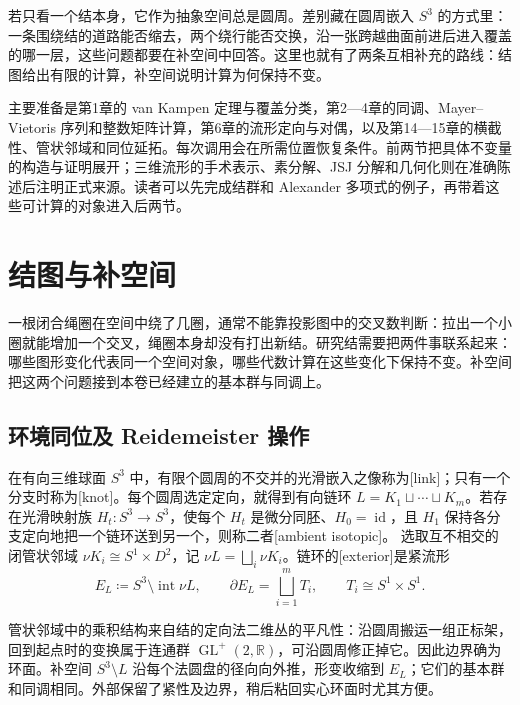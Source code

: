 若只看一个结本身，它作为抽象空间总是圆周。差别藏在圆周嵌入 \(S^3\) 的方式里：一条围绕结的道路能否缩去，两个绕行能否交换，沿一张跨越曲面前进后进入覆盖的哪一层，这些问题都要在补空间中回答。这里也就有了两条互相补充的路线：结图给出有限的计算，补空间说明计算为何保持不变。

\ProseParagraphBreak

主要准备是第1章的 van Kampen 定理与覆盖分类，第2—4章的同调、Mayer--Vietoris 序列和整数矩阵计算，第6章的流形定向与对偶，以及第14—15章的横截性、管状邻域和同位延拓。每次调用会在所需位置恢复条件。前两节把具体不变量的构造与证明展开；三维流形的手术表示、素分解、JSJ 分解和几何化则在准确陈述后注明正式来源。读者可以先完成结群和 Alexander 多项式的例子，再带着这些可计算的对象进入后两节。

\section{结图与补空间}
\label{g2:sec:A01}

一根闭合绳圈在空间中绕了几圈，通常不能靠投影图中的交叉数判断：拉出一个小圈就能增加一个交叉，绳圈本身却没有打出新结。研究结需要把两件事联系起来：哪些图形变化代表同一个空间对象，哪些代数计算在这些变化下保持不变。补空间把这两个问题接到本卷已经建立的基本群与同调上。

\subsection{环境同位及 Reidemeister 操作}
\label{g2:subsec:A01:01}

\begin{definition}\label{g2:def:oriented-link-exterior}
	在有向三维球面 \(S^3\) 中，有限个圆周的不交并的光滑嵌入之像称为[link]；只有一个分支时称为[knot]。每个圆周选定定向，就得到有向链环 \(L=K_1\sqcup\cdots\sqcup K_m\)。若存在光滑映射族 \(H_t:S^3\rightarrow S^3\)，使每个 \(H_t\) 是微分同胚、\(H_0=\operatorname{id}\)，且 \(H_1\) 保持各分支定向地把一个链环送到另一个，则称二者[ambient isotopic]。
	选取互不相交的闭管状邻域 \(\nu K_i\cong S^1\times D^2\)，记 \(\nu L=\bigsqcup_i\nu K_i\)。链环的[exterior]是紧流形
	\[
		E_L\coloneqq S^3\setminus\operatorname{int}\nu L,
		\qquad \partial E_L=\bigsqcup_{i=1}^m T_i,
		\qquad T_i\cong S^1\times S^1.
	\]
\end{definition}

管状邻域中的乘积结构来自结的定向法二维丛的平凡性：沿圆周搬运一组正标架，回到起点时的变换属于连通群 \(\operatorname{GL}^+(2,\mathbb R)\)，可沿圆周修正掉它。因此边界确为环面。补空间 \(S^3\setminus L\) 沿每个法圆盘的径向向外推，形变收缩到 \(E_L\)；它们的基本群和同调相同。外部保留了紧性及边界，稍后粘回实心环面时尤其方便。

